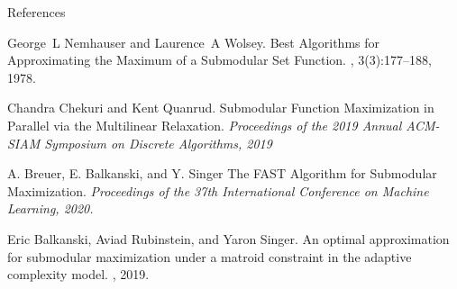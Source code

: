 \documentclass{beamer} %
\begin{document}
\begin{frame}{References}
\tiny %
\begin{thebibliography}{99}
     George~L Nemhauser and Laurence~A Wolsey.
	\newblock Best Algorithms for Approximating the Maximum of a Submodular Set Function.
	, 3(3):177--188, 1978.
	
     Chandra Chekuri and Kent Quanrud.
	\newblock Submodular Function Maximization in Parallel via the Multilinear Relaxation.
	\newblock \emph{Proceedings of the 2019 Annual ACM-SIAM Symposium on Discrete Algorithms, 2019}

     A. Breuer, E. Balkanski, and Y. Singer
	\newblock The FAST Algorithm for Submodular Maximization.
	\newblock \emph{Proceedings of the 37th International Conference on Machine Learning, 2020.}
	
	 Eric Balkanski, Aviad Rubinstein, and Yaron Singer.
	\newblock An optimal approximation for submodular maximization under a matroid constraint in the adaptive complexity model.
	, 2019.
	
\end{thebibliography}
\end{frame}
\end{document}
